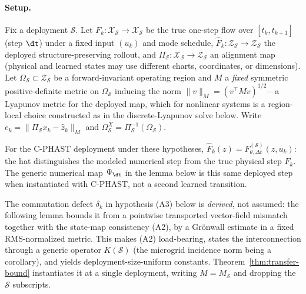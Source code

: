 \paragraph{Setup.}
Fix a deployment $\mathcal S$. Let $F_k:\mathcal X_{\mathcal S}\to\mathcal X_{\mathcal S}$ be the true one-step flow over $[t_k,t_{k+1}]$ (step $\dt$) under a fixed input $(u_k)$ and mode schedule, $\widehat F_k:\mathcal Z_{\mathcal S}\to\mathcal Z_{\mathcal S}$ the deployed structure-preserving rollout, and $\Pi_{\mathcal S}:\mathcal X_{\mathcal S}\to\mathcal Z_{\mathcal S}$ an alignment map (physical and learned states may use different charts, coordinates, or dimensions). Let $\Omega_{\mathcal S}\subset\mathcal Z_{\mathcal S}$ be a forward-invariant operating region and $M$ a \emph{fixed} symmetric positive-definite metric on $\Omega_{\mathcal S}$ inducing the norm $\lVert v\rVert_M=(v^\top Mv)^{1/2}$---a Lyapunov metric for the deployed map, which for nonlinear systems is a region-local choice constructed as in the discrete-Lyapunov solve below. Write $e_k=\lVert\Pi_{\mathcal S}x_k-\hat z_k\rVert_M$ and $\Omega^{X}_{\mathcal S}=\Pi_{\mathcal S}^{-1}(\Omega_{\mathcal S})$.

For the C-PHAST deployment under these hypotheses,
$\widehat F_k(z)=F_{\theta,\Delta t}^{(\mathcal S)}(z,u_k)$: the hat distinguishes
the modeled numerical step from the true physical step $F_k$. The generic
numerical map $\Psi_{\dt}$ in the lemma below is this same deployed step when
instantiated with C-PHAST, not a second learned transition.

The commutation defect $\delta_k$ in hypothesis (A3) below is \emph{derived}, not assumed: the following lemma bounds it from a pointwise transported vector-field mismatch together with the state-map consistency (A2), by a Gr\"onwall estimate in a fixed RMS-normalized metric. This makes (A2) load-bearing, states the interconnection through a generic operator $K(\mathcal S)$ (the microgrid incidence norm being a corollary), and yields deployment-size-uniform constants. Theorem~\ref{thm:transfer-bound} instantiates it at a single deployment, writing $M=M_{\mathcal S}$ and dropping the $\mathcal S$ subscripts.



